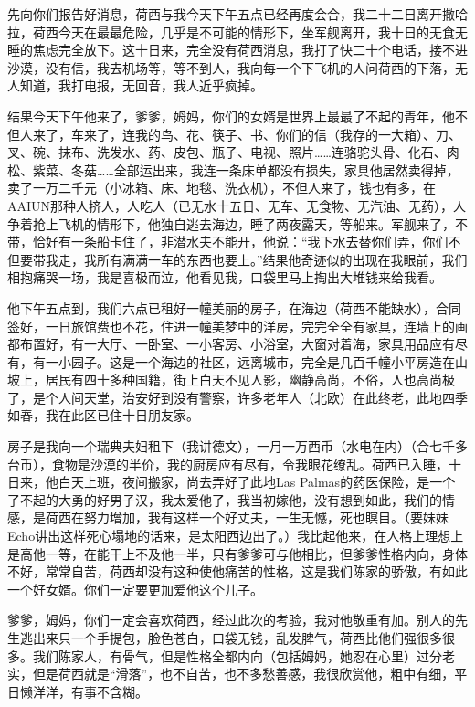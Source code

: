 \par {}
\par 先向你们报告好消息，荷西与我今天下午五点已经再度会合，我二十二日离开撒哈拉，荷西今天在最最危险，几乎是不可能的情形下，坐军舰离开，我十日的无食无睡的焦虑完全放下。这十日来，完全没有荷西消息，我打了快二十个电话，接不进沙漠，没有信，我去机场等，等不到人，我向每一个下飞机的人问荷西的下落，无人知道，我打电报，无回音，我人近乎疯掉。
\par 结果今天下午他来了，爹爹，姆妈，你们的女婿是世界上最最了不起的青年，他不但人来了，车来了，连我的鸟、花、筷子、书、你们的信（我存的一大箱）、刀、叉、碗、抹布、洗发水、药、皮包、瓶子、电视、照片……连骆驼头骨、化石、肉松、紫菜、冬菇……全部运出来，我连一条床单都没有损失，家具他居然卖得掉，卖了一万二千元（小冰箱、床、地毯、洗衣机），不但人来了，钱也有多，在AAIUN那种人挤人，人吃人（已无水十五日、无车、无食物、无汽油、无药），人争着抢上飞机的情形下，他独自逃去海边，睡了两夜露天，等船来。军舰来了，不带，恰好有一条船卡住了，非潜水夫不能开，他说：“我下水去替你们弄，你们不但要带我走，我所有满满一车的东西也要上。”结果他奇迹似的出现在我眼前，我们相抱痛哭一场，我是喜极而泣，他看见我，口袋里马上掏出大堆钱来给我看。
\par 他下午五点到，我们六点已租好一幢美丽的房子，在海边（荷西不能缺水），合同签好，一日旅馆费也不花，住进一幢美梦中的洋房，完完全全有家具，连墙上的画都布置好，有一大厅、一卧室、一小客房、小浴室，大窗对着海，家具用品应有尽有，有一小园子。这是一个海边的社区，远离城市，完全是几百千幢小平房造在山坡上，居民有四十多种国籍，街上白天不见人影，幽静高尚，不俗，人也高尚极了，是个人间天堂，治安好到没有警察，许多老年人（北欧）在此终老，此地四季如春，我在此区已住十日朋友家。
\par 房子是我向一个瑞典夫妇租下（我讲德文），一月一万西币（水电在内）（合七千多台币），食物是沙漠的半价，我的厨房应有尽有，令我眼花缭乱。荷西已入睡，十日来，他白天上班，夜间搬家，尚去弄好了此地Las Palmas的药医保险，是一个了不起的大勇的好男子汉，我太爱他了，我当初嫁他，没有想到如此，我们的情感，是荷西在努力增加，我有这样一个好丈夫，一生无憾，死也瞑目。（要妹妹Echo讲出这样死心塌地的话来，是太阳西边出了。）我比起他来，在人格上理想上是高他一等，在能干上不及他一半，只有爹爹可与他相比，但爹爹性格内向，身体不好，常常自苦，荷西却没有这种使他痛苦的性格，这是我们陈家的骄傲，有如此一个好女婿。你们一定要更加爱他这个儿子。
\par 爹爹，姆妈，你们一定会喜欢荷西，经过此次的考验，我对他敬重有加。别人的先生逃出来只一个手提包，脸色苍白，口袋无钱，乱发脾气，荷西比他们强很多很多。我们陈家人，有骨气，但是性格全都内向（包括姆妈，她忍在心里）过分老实，但是荷西就是“滑落”，也不自苦，也不多愁善感，我很欣赏他，粗中有细，平日懒洋洋，有事不含糊。
